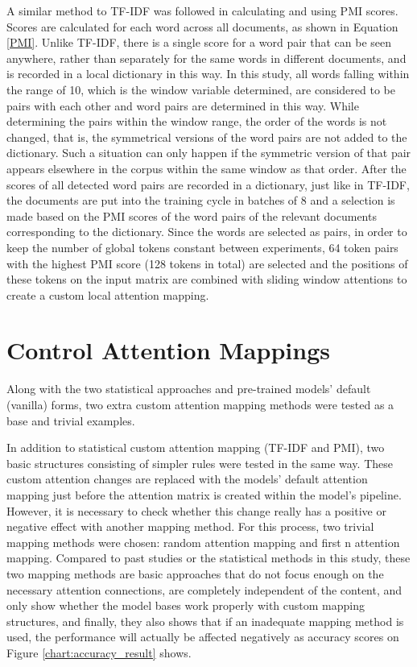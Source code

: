 \documentclass{iyte}
\begin{document}
A similar method to TF-IDF was followed in calculating and using PMI scores. Scores are calculated for each word across all documents, as shown in Equation \ref{PMI}. Unlike TF-IDF, there is a single score for a word pair that can be seen anywhere, rather than separately for the same words in different documents, and is recorded in a local dictionary in this way. In this study, all words falling within the range of 10, which is the window variable determined, are considered to be pairs with each other and word pairs are determined in this way. While determining the pairs within the window range, the order of the words is not changed, that is, the symmetrical versions of the word pairs are not added to the dictionary. Such a situation can only happen if the symmetric version of that pair appears elsewhere in the corpus within the same window as that order. After the scores of all detected word pairs are recorded in a dictionary, just like in TF-IDF, the documents are put into the training cycle in batches of 8 and a selection is made based on the PMI scores of the word pairs of the relevant documents corresponding to the dictionary. Since the words are selected as pairs, in order to keep the number of global tokens constant between experiments, 64 token pairs with the highest PMI score (128 tokens in total) are selected and the positions of these tokens on the input matrix are combined with sliding window attentions to create a custom local attention mapping.

\section{Control Attention Mappings}

Along with the two statistical approaches and pre-trained models' default (vanilla) forms, two extra custom attention mapping methods were tested as a base and trivial examples.

In addition to statistical custom attention mapping (TF-IDF and PMI), two basic structures consisting of simpler rules were tested in the same way. These custom attention changes are replaced with the models' default attention mapping just before the attention matrix is created within the model's pipeline. However, it is necessary to check whether this change really has a positive or negative effect with another mapping method. For this process, two trivial mapping methods were chosen: random attention mapping and first n attention mapping. Compared to past studies or the statistical methods in this study, these two mapping methods are basic approaches that do not focus enough on the necessary attention connections, are completely independent of the content, and only show whether the model bases work properly with custom mapping structures, and finally, they also shows that if an inadequate mapping method is used, the performance will actually be affected negatively as accuracy scores on Figure \ref{chart:accuracy_result} shows.
\end{document}

